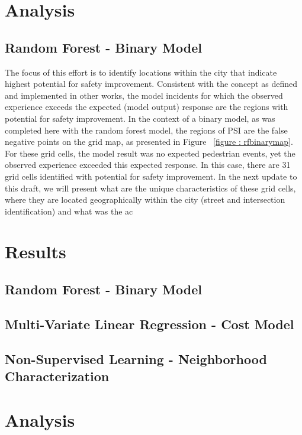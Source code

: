 \documentclass{llncs}
\begin{document}
\section{Analysis}
%
\subsection{Random Forest - Binary Model}

The focus of this effort is to identify locations within the city that indicate highest potential for safety improvement. Consistent with the concept as defined and implemented in other works, the model incidents for which the observed experience exceeds the expected (model output) response are the regions with potential for safety improvement. In the context of a binary model, as was completed here with the random forest model, the regions of PSI are the false negative points on the grid map, as presented in Figure ~\ref{figure : rfbinarymap}. For these grid cells, the model result was no expected pedestrian events, yet the observed experience exceeded this expected response. In this case, there are 31 grid cells identified with potential for safety improvement. In the next update to this draft, we will present what are the unique characteristics of these grid cells, where they are located geographically within the city (street and intersection identification) and what was the ac
%
\section{Results}
%

\subsection{Random Forest - Binary Model}

\subsection{Multi-Variate Linear Regression - Cost Model}

\subsection{Non-Supervised Learning - Neighborhood Characterization}

%
\section{Analysis}
%
\end{document}
